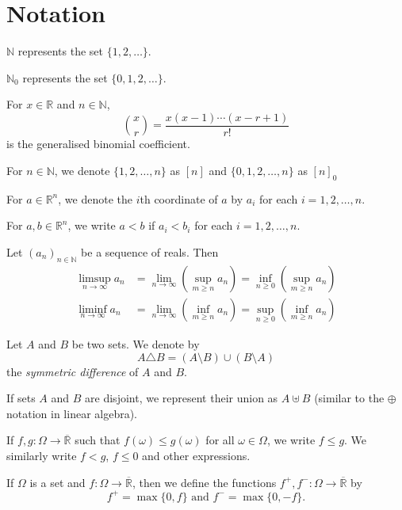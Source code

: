 \section{Notation}

$\mathbb{N}$ represents the set $\{1,2,\ldots\}$.

\vspace{1mm}
$\mathbb{N}_0$ represents the set $\{0,1,2,\ldots\}$.

\vspace{1mm}
For $x\in\mathbb{R}$ and $n\in\mathbb{N}$,
$$\binom{x}{r}=\frac{x(x-1)\cdots(x-r+1)}{r!}$$
is the generalised binomial coefficient.

\vspace{2mm}
For $n\in\mathbb{N}$, we denote $\{1,2,\ldots,n\}$ as $[n]$ and $\{0,1,2,\ldots,n\}$ as $[n]_0$

\vspace{2mm}
For $a\in\mathbb{R}^n$, we denote the $i$th coordinate of $a$ by $a_i$ for each $i=1,2,\ldots,n$.

\vspace{1mm}
For $a,b\in\mathbb{R}^n$, we write $a<b$ if $a_i<b_i$ for each $i=1,2,\ldots,n$.

\vspace{2mm}
Let $(a_n)_{n\in\mathbb{N}}$ be a sequence of reals. Then
\begin{align*}
    \limsup_{n\to\infty}a_n &= \lim_{n\to\infty}\left(\sup_{m\geq n}a_n\right) =    \inf_{n\geq 0}\left(\sup_{m\geq n}a_n\right) \\
    \liminf_{n\to\infty}a_n &= \lim_{n\to\infty}\left(\inf_{m\geq n}a_n\right) =    \sup_{n\geq 0}\left(\inf_{m\geq n}a_n\right)
\end{align*}

\vspace{2mm}
Let $A$ and $B$ be two sets. We denote by
$$A\triangle B=(A\setminus B)\cup(B\setminus A)$$
the \textit{symmetric difference} of $A$ and $B$.

\vspace{2mm}
If sets $A$ and $B$ are disjoint, we represent their union as $A\uplus B$ (similar to the $\oplus$ notation in linear algebra).   

\vspace{2mm}
If $f,g:\Omega\to\overline{\mathbb{R}}$ such that $f(\omega)\leq g(\omega)$ for all $\omega\in\Omega$, we write $f\leq g$. We similarly write $f<g$, $f\leq 0$ and other expressions.

\vspace{2mm}
If $\Omega$ is a set and $f:\Omega\to\overline{\mathbb{R}}$, then we define the functions $f^+,f^-:\Omega\to\overline{\mathbb{R}}$ by
$$f^+=\max\{0,f\}\text{ and }f^-=\max\{0,-f\}.$$
\clearpage